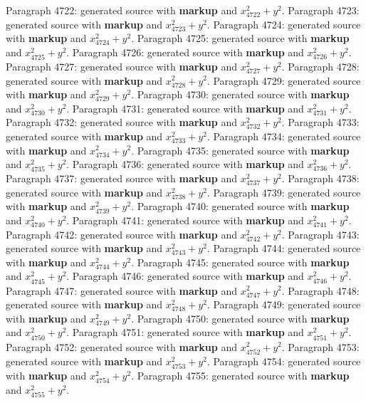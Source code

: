 \documentclass{article}
\begin{document}
Paragraph 4722: generated source with \textbf{markup} and $x_{4722}^2 + y^2$.
Paragraph 4723: generated source with \textbf{markup} and $x_{4723}^2 + y^2$.
Paragraph 4724: generated source with \textbf{markup} and $x_{4724}^2 + y^2$.
Paragraph 4725: generated source with \textbf{markup} and $x_{4725}^2 + y^2$.
Paragraph 4726: generated source with \textbf{markup} and $x_{4726}^2 + y^2$.
Paragraph 4727: generated source with \textbf{markup} and $x_{4727}^2 + y^2$.
Paragraph 4728: generated source with \textbf{markup} and $x_{4728}^2 + y^2$.
Paragraph 4729: generated source with \textbf{markup} and $x_{4729}^2 + y^2$.
Paragraph 4730: generated source with \textbf{markup} and $x_{4730}^2 + y^2$.
Paragraph 4731: generated source with \textbf{markup} and $x_{4731}^2 + y^2$.
Paragraph 4732: generated source with \textbf{markup} and $x_{4732}^2 + y^2$.
Paragraph 4733: generated source with \textbf{markup} and $x_{4733}^2 + y^2$.
Paragraph 4734: generated source with \textbf{markup} and $x_{4734}^2 + y^2$.
Paragraph 4735: generated source with \textbf{markup} and $x_{4735}^2 + y^2$.
Paragraph 4736: generated source with \textbf{markup} and $x_{4736}^2 + y^2$.
Paragraph 4737: generated source with \textbf{markup} and $x_{4737}^2 + y^2$.
Paragraph 4738: generated source with \textbf{markup} and $x_{4738}^2 + y^2$.
Paragraph 4739: generated source with \textbf{markup} and $x_{4739}^2 + y^2$.
Paragraph 4740: generated source with \textbf{markup} and $x_{4740}^2 + y^2$.
Paragraph 4741: generated source with \textbf{markup} and $x_{4741}^2 + y^2$.
Paragraph 4742: generated source with \textbf{markup} and $x_{4742}^2 + y^2$.
Paragraph 4743: generated source with \textbf{markup} and $x_{4743}^2 + y^2$.
Paragraph 4744: generated source with \textbf{markup} and $x_{4744}^2 + y^2$.
Paragraph 4745: generated source with \textbf{markup} and $x_{4745}^2 + y^2$.
Paragraph 4746: generated source with \textbf{markup} and $x_{4746}^2 + y^2$.
Paragraph 4747: generated source with \textbf{markup} and $x_{4747}^2 + y^2$.
Paragraph 4748: generated source with \textbf{markup} and $x_{4748}^2 + y^2$.
Paragraph 4749: generated source with \textbf{markup} and $x_{4749}^2 + y^2$.
Paragraph 4750: generated source with \textbf{markup} and $x_{4750}^2 + y^2$.
Paragraph 4751: generated source with \textbf{markup} and $x_{4751}^2 + y^2$.
Paragraph 4752: generated source with \textbf{markup} and $x_{4752}^2 + y^2$.
Paragraph 4753: generated source with \textbf{markup} and $x_{4753}^2 + y^2$.
Paragraph 4754: generated source with \textbf{markup} and $x_{4754}^2 + y^2$.
Paragraph 4755: generated source with \textbf{markup} and $x_{4755}^2 + y^2$.
\end{document}
